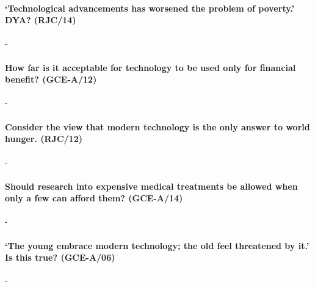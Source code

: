 \documentclass[../../main]{subfiles}
\begin{document}
\paragraph{`Technological advancements has worsened the problem of poverty.' DYA? (RJC/14)}-

\paragraph{How far is it acceptable for technology to be used only for financial benefit? (GCE-A/12)}-

\paragraph{Consider the view that modern technology is the only answer to world hunger. (RJC/12)}-

\paragraph{Should research into expensive medical treatments be allowed when only a few can afford them? (GCE-A/14)}-

\paragraph{`The young embrace modern technology; the old feel threatened by it.' Is this true? (GCE-A/06)}-
\end{document}
